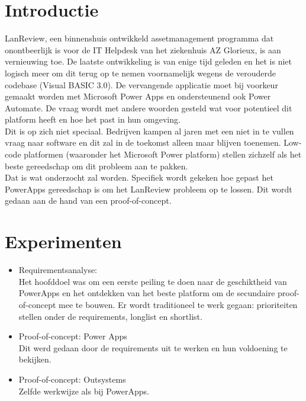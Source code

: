 \documentclass[a0,portrait]{a0poster}
\begin{document}
\begin{multicols}{2}
\color{HoGentAccent1} 
\section*{Introductie}
\color{black}
\color{black}
LanReview, een binnenshuis ontwikkeld assetmanagement programma dat onontbeerlijk is voor de IT Helpdesk van het ziekenhuis AZ Glorieux, is aan vernieuwing toe. De laatste ontwikkeling is van enige tijd geleden en het is niet logisch meer om dit terug op te nemen voornamelijk wegens de verouderde codebase (Visual BASIC 3.0). De vervangende applicatie moet bij voorkeur gemaakt worden met Microsoft Power Apps en ondersteunend ook Power Automate. De vraag wordt met andere woorden gesteld wat voor potentieel dit platform heeft en hoe het past in hun omgeving.\\
Dit is op zich niet speciaal. Bedrijven kampen al jaren met een niet in te vullen vraag naar software en dit zal in de toekomst alleen maar blijven toenemen. Low-code platformen (waaronder het Microsoft Power platform) stellen zichzelf als het beste gereedschap om dit probleem aan te pakken.\\
Dat is wat onderzocht zal worden. Specifiek wordt gekeken hoe gepast het PowerApps gereedschap is om het LanReview probleem op te lossen. Dit wordt gedaan aan de hand van een proof-of-concept.



\color{Black} %
\color{HoGentAccent1} 
\section*{Experimenten}
\color{black}
\begin{itemize}
    \item Requirementsanalyse:\\
    Het hoofddoel was om een eerste peiling te doen naar de geschiktheid van PowerApps en het ontdekken van het beste platform om de secundaire proof-of-concept mee te bouwen. Er wordt traditioneel te werk gegaan: prioriteiten stellen onder de requirements, longlist en shortlist.
    \item Proof-of-concept: Power Apps\\
    Dit werd gedaan door de requirements uit te werken en hun voldoening te bekijken.
    \item Proof-of-concept: Outsystems\\
    Zelfde werkwijze als bij PowerApps.
\end{itemize}



\end{multicols}
\end{document}
